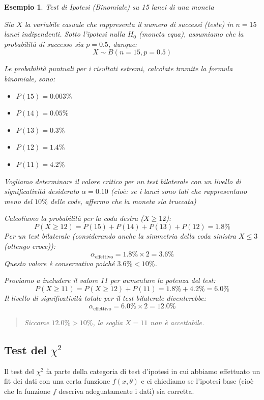 \documentclass[openany,a4paper,12pt]{book}
\newtheorem*{example}{Esempio}
\theoremstyle{remark}
\begin{document}
\begin{example}{Test di Ipotesi (Binomiale) su 15 lanci di una moneta}

Sia $X$ la variabile casuale che rappresenta il numero di successi (teste) in $n = 15$ lanci indipendenti. Sotto l'ipotesi nulla $H_0$ (moneta equa), assumiamo che la probabilità di successo sia $p = 0.5$, dunque:
\[ X \sim B(n=15, p=0.5) \]

Le probabilità puntuali per i risultati estremi, calcolate tramite la formula binomiale, sono:
\begin{itemize}
    \item $P(15) = 0.003\%$
    \item $P(14) = 0.05\%$
    \item $P(13) = 0.3\%$
    \item $P(12) = 1.4\%$
    \item $P(11) = 4.2\%$
\end{itemize}

Vogliamo determinare il valore critico per un test bilaterale con un livello di significatività desiderato $\alpha = 0.10$
(cioè: se i lanci sono tali che rappresentano meno del $10\%$ delle code, affermo che la moneta sia truccata)

Calcoliamo la probabilità per la coda destra ($X \ge 12$):
\[ P(X \ge 12) = P(15) + P(14) + P(13) + P(12) = 1.8\% \]
Per un test bilaterale (considerando anche la simmetria della coda sinistra $X \le 3$ (ottengo croce)):
\[ \alpha_{\text{effettivo}} = 1.8\% \times 2 = 3.6\% \]
Questo valore è conservativo poiché $3.6\% < 10\%$.

Proviamo a includere il valore 11 per aumentare la potenza del test:
\[ P(X \ge 11) = P(X \ge 12) + P(11) = 1.8\% + 4.2\% = 6.0\% \]
Il livello di significatività totale per il test bilaterale diventerebbe:
\[ \alpha_{\text{effettivo}} = 6.0\% \times 2 = 12.0\% \]

\begin{quote}
    Siccome $12.0\% > 10\%$, la soglia $X=11$ non è accettabile. 
\end{quote}
\end{example}

\subsection{Test del $\chi^2$}
Il test del $\chi^2$ fa parte della categoria di test d'ipotesi in cui abbiamo effettuato un fit dei dati con una certa funzione $f(x, \theta)$ e ci chiediamo se l'ipotesi base (cioè che la funzione $f$ descriva adeguatamente i dati) sia corretta. 
\end{document}
